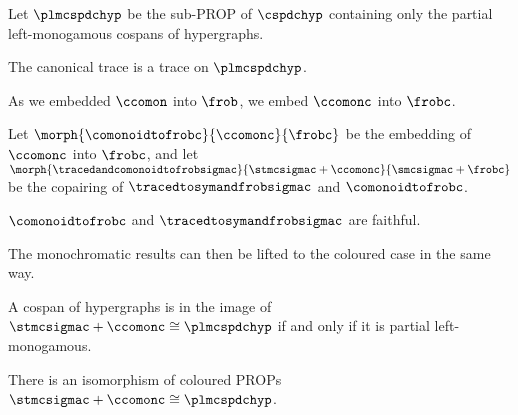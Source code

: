 \begin{definition}
    Let \(\plmcspdchyp\) be the sub-PROP of \(\cspdchyp\) containing only the
    partial left-monogamous cospans of hypergraphs.
\end{definition}

\begin{proposition}
    The canonical trace is a trace on \(\plmcspdchyp\).
\end{proposition}

As we embedded \(\ccomon\) into \(\frob\), we embed \(\ccomonc\) into
\(\frobc\).

\begin{definition}
    Let \(
    \morph{
        \comonoidtofrobc
    }{
        \ccomonc
    }{
        \frobc
    }
    \) be the embedding of \(\ccomonc\) into \(\frobc\), and let \(
    \morph{
        \tracedandcomonoidtofrobsigmac
    }{
        \stmcsigmac + \ccomonc
    }{
        \smcsigmac + \frobc
    }
    \) be the copairing of \(\tracedtosymandfrobsigmac\) and
    \(\comonoidtofrobc\).
\end{definition}

\begin{corollary}
    \(\comonoidtofrobc\) and \(\tracedtosymandfrobsigmac\) are faithful.
\end{corollary}

The monochromatic results can then be lifted to the coloured case in the same
way.

\begin{theorem}\label{thm:comonoidc-fully-complete}
    A cospan of hypergraphs is in the image of
    \(\stmcsigmac + \ccomonc \cong \plmcspdchyp\) if and only if it is partial
    left-monogamous.
\end{theorem}

\begin{corollary}
    There is an isomorphism of coloured PROPs
    \(\stmcsigmac + \ccomonc \cong \plmcspdchyp\).
\end{corollary}